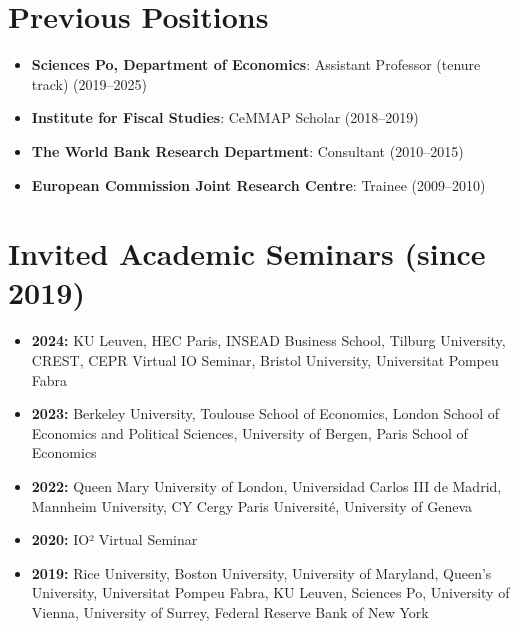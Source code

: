 \documentclass[11pt,a4paper]{article}
\begin{document}
\section*{Previous Positions}
\begin{itemize}
\renewcommand{\labelitemi}{\fontsize{4}{4}\selectfont$\blacksquare$}
\item \textbf{Sciences Po, Department of Economics}: Assistant Professor (tenure track) (2019--2025) \vspace{0.1cm}
\item \textbf{Institute for Fiscal Studies}: CeMMAP Scholar (2018--2019) \vspace{0.1cm}
\item \textbf{The World Bank Research Department}: Consultant (2010--2015) \vspace{0.1cm}
\item \textbf{European Commission Joint Research Centre}: Trainee (2009--2010) \vspace{0.1cm}
\end{itemize}


\section*{Invited Academic Seminars (since 2019)}
\begin{itemize}
\renewcommand{\labelitemi}{\fontsize{4}{4}\selectfont$\blacksquare$}
\item \textbf{2024:} KU Leuven, HEC Paris, INSEAD Business School, Tilburg University, CREST, CEPR Virtual IO Seminar, Bristol University, Universitat Pompeu Fabra \vspace{0.15cm}
\item \textbf{2023:} Berkeley University, Toulouse School of Economics, London School of Economics and Political Sciences, University of Bergen, Paris School of Economics \vspace{0.15cm}
\item \textbf{2022:} Queen Mary University of London, Universidad Carlos III de Madrid, Mannheim University, CY Cergy Paris Université, University of Geneva \vspace{0.15cm}
\item \textbf{2020:} IO² Virtual Seminar \vspace{0.15cm}
\item \textbf{2019:} Rice University, Boston University, University of Maryland, Queen's University, Universitat Pompeu Fabra, KU Leuven, Sciences Po, University of Vienna, University of Surrey, Federal Reserve Bank of New York \vspace{0.15cm}
\end{itemize}
\end{document}
